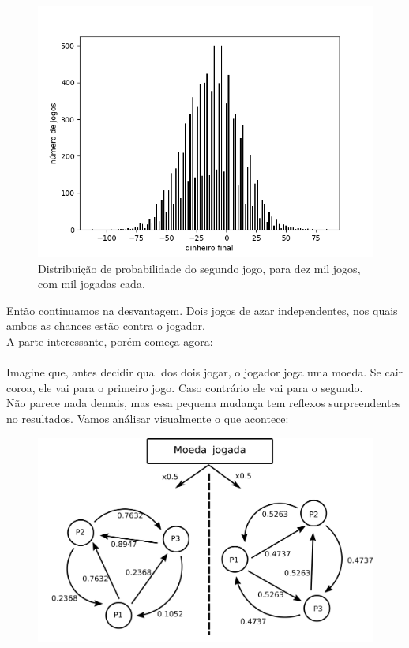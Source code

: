 \documentclass[12pt]{article}
\begin{document}
\begin{figure}[H]
\centering
\includegraphics[scale=0.8]{graph8.png}
\caption{Distribuição de probabilidade do segundo jogo, para dez mil jogos, com mil jogadas cada.}
\end{figure}

Então continuamos na desvantagem. Dois jogos de azar independentes, nos quais ambos as chances estão contra o jogador.\\
A parte interessante, porém começa agora:\\
\\
Imagine que, antes decidir qual dos dois jogar, o jogador joga uma moeda. Se cair coroa, ele vai para o primeiro jogo. Caso contrário ele vai para o segundo.\\
Não parece nada demais, mas essa pequena mudança tem reflexos surpreendentes no resultados. Vamos análisar visualmente o que acontece:

\begin{figure}[H]
\centering
\includegraphics[scale=0.5]{fig4.png}
\end{figure}
\end{document}
